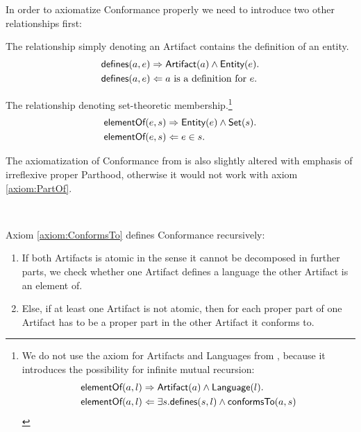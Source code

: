 In order to axiomatize \gls{Conformance} properly we need to introduce two other relationships first:
\begin{description}[align=left]
\item[\defines]
The relationship simply denoting an \gls{Artifact} contains the definition of an entity.
\begin{align*}
\textsf{defines}(a,e)
&\Rightarrow
\textsf{Artifact}(a) \wedge \textsf{Entity}(e).\\
\textsf{defines}(a,e)
&\Leftarrow
a \text{ is a definition for } e.
\end{align*}

\item[\elementOf]
The relationship denoting set-theoretic membership.\footnote{We do not use the \elementOf axiom for \glspl{Artifact} and \glspl{Language} from \cite{HeinzLV17}, because it introduces the possibility for infinite mutual recursion:
\begin{align*}
\textsf{elementOf}(a,l)
&\Rightarrow
\textsf{Artifact}(a) \wedge \textsf{Language}(l).\\
\textsf{elementOf}(a,l)
&\Leftarrow
\exists s.\textsf{defines}(s,l) \wedge \textsf{conformsTo}(a,s)
\end{align*}}
\begin{align*}
\textsf{elementOf}(e,s)
&\Rightarrow
\textsf{Entity}(e) \wedge \textsf{Set}(s).\\
\textsf{elementOf}(e,s)
&\Leftarrow
e \in s.
\end{align*}


\end{description}


The axiomatization of \gls{Conformance} from \cite{HeinzLV17} is also slightly altered with emphasis of irreflexive proper \gls{Parthood}, otherwise it would not work with axiom \ref{axiom:PartOf}.
\begin{axiom}[\conformsTo]
\label{axiom:ConformsTo}
~\newline
{}
\end{axiom}
Axiom \ref{axiom:ConformsTo} defines \gls{Conformance} recursively:
\begin{enumerate}[align=left,label=\textbf{Case \Roman*},ref={\Roman*}]
\item
If both \glspl{Artifact} is atomic in the sense it cannot be decomposed in further parts, we check whether one \gls{Artifact} defines a language the other \gls{Artifact} is an element of.

\item
Else, if at least one \gls{Artifact} is not atomic, then for each proper part of one \gls{Artifact} has to be a proper part in the other \gls{Artifact} it conforms to.
\end{enumerate}


